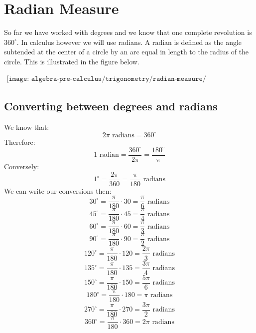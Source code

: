 \section{Radian Measure}
So far we have worked with degrees and we know that one complete revolution is $360^{\circ}$. In calculus however we will use radians. A radian is defined as the angle subtended at the center of a circle by an arc equal in length to the radius of the circle. This is illustrated in the figure below.

\begin{align*}
\texttt{[image: algebra-pre-calculus/trigonometry/radian-measure/radian\_measure.png]}
\end{align*}


\subsection{Converting between degrees and radians}
We know that: $$ 2\pi \text{ radians} = 360^{\circ} $$
Therefore: $$ 1 \text{ radian} = \frac{360^{\circ}}{2\pi} = \frac{180^{\circ}}{\pi} $$
Conversely: $$ 1^{\circ} = \frac{2\pi}{360} = \frac{\pi}{180} \text{ radians} $$
We can write our conversions then: 
$$ 30^{\circ} = \frac{\pi}{180} \cdot 30 = \frac{\pi}{6} \text{ radians} $$
$$ 45^{\circ} = \frac{\pi}{180} \cdot 45 = \frac{\pi}{4} \text{ radians} $$
$$ 60^{\circ} = \frac{\pi}{180} \cdot 60 = \frac{\pi}{3} \text{ radians} $$
$$ 90^{\circ} = \frac{\pi}{180} \cdot 90 = \frac{\pi}{2} \text{ radians} $$
$$ 120^{\circ} = \frac{\pi}{180} \cdot 120 = \frac{2\pi}{3} \text{ radians} $$
$$ 135^{\circ} = \frac{\pi}{180} \cdot 135 = \frac{3\pi}{4} \text{ radians} $$
$$ 150^{\circ} = \frac{\pi}{180} \cdot 150 = \frac{5\pi}{6} \text{ radians} $$
$$ 180^{\circ} = \frac{\pi}{180} \cdot 180 = \pi \text{ radians} $$
$$ 270^{\circ} = \frac{\pi}{180} \cdot 270 = \frac{3\pi}{2} \text{ radians} $$
$$ 360^{\circ} = \frac{\pi}{180} \cdot 360 = 2\pi \text{ radians} $$